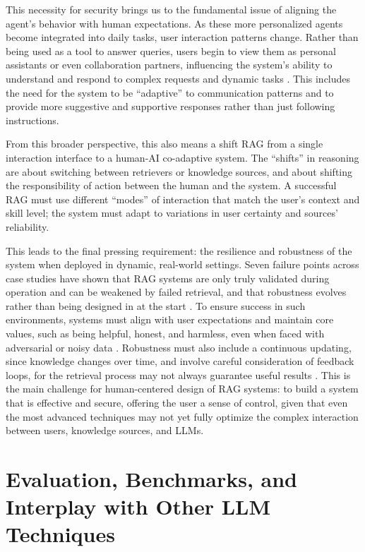 \documentclass[11pt]{article}
\begin{document}
This necessity for security brings us to the fundamental issue of aligning the agent's behavior with human expectations. As these more personalized agents become integrated into daily tasks, user interaction patterns change. Rather than being used as a tool to answer queries, users begin to view them as personal assistants or even collaboration partners, influencing the system's ability to understand and respond to complex requests and dynamic tasks \cite{ref401}. This includes the need for the system to be ``adaptive'' to communication patterns and to provide more suggestive and supportive responses rather than just following instructions.

From this broader perspective, this also means a shift RAG from a single interaction interface to a human-AI co-adaptive system. The ``shifts'' in reasoning are about switching between retrievers or knowledge sources, and about shifting the responsibility of action between the human and the system. A successful RAG must use different ``modes'' of interaction that match the user's context and skill level; the system must adapt to variations in user certainty and sources' reliability.

This leads to the final pressing requirement: the resilience and robustness of the system when deployed in dynamic, real-world settings. Seven failure points across case studies have shown that RAG systems are only truly validated during operation and can be weakened by failed retrieval, and that robustness evolves rather than being designed in at the start \cite{ref402}. To ensure success in such environments, systems must align with user expectations and maintain core values, such as being helpful, honest, and harmless, even when faced with adversarial or noisy data \cite{ref180}. Robustness must also include a continuous updating, since knowledge changes over time, and involve careful consideration of feedback loops, for the retrieval process may not always guarantee useful results \cite{ref58}. This is the main challenge for human-centered design of RAG systems: to build a system that is effective and secure, offering the user a sense of control, given that even the most advanced techniques may not yet fully optimize the complex interaction between users, knowledge sources, and LLMs.

\section{Evaluation, Benchmarks, and Interplay with Other LLM Techniques}
\end{document}
